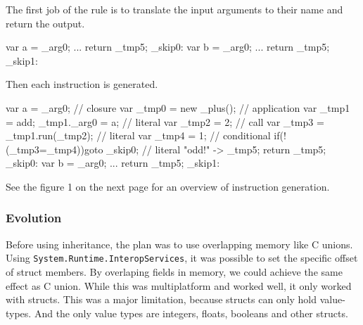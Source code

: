 The first job of the rule is to translate the input arguments to their name and return the output.

\begin{CS}
    {
        var a = _arg0; 
        ...
        return _tmp5;
    }
    _skip0:
    {
        var b = _arg0;
        ...
        return _tmp5;
    }
    _skip1:
\end{CS}

Then each instruction is generated.

\begin{CS}
    {
        var a = _arg0; 
        // closure
        var _tmp0 = new _plus(); 
        // application
        var _tmp1 = add;
        _tmp1._arg0 = a;
        // literal
        var _tmp2 = 2;
        // call
        var _tmp3 = _tmp1.run(_tmp2);
        // literal     
        var _tmp4 = 1;
        // conditional
        if(!(_tmp3=_tmp4)){goto _skip0;}
        // literal
        "odd!" -> _tmp5;
        return _tmp5;
    }
    _skip0:
    {
        var b = _arg0;
        ...
        return _tmp5;
    }
    _skip1:
\end{CS}

See the figure 1 on the next page for an overview of instruction generation.

\subsubsection{Evolution}
Before using inheritance, the plan was to use overlapping memory like C unions. 
Using \verb|System.|\verb|Runtime.|\verb|InteropServices|, it was possible to set the specific offset of struct members.
By overlaping fields in memory, we could achieve the same effect as C union.
While this was multiplatform and worked well, it only worked with structs.
This was a major limitation, because structs can only hold value-types.
And the only value types are integers, floats, booleans and other structs.

